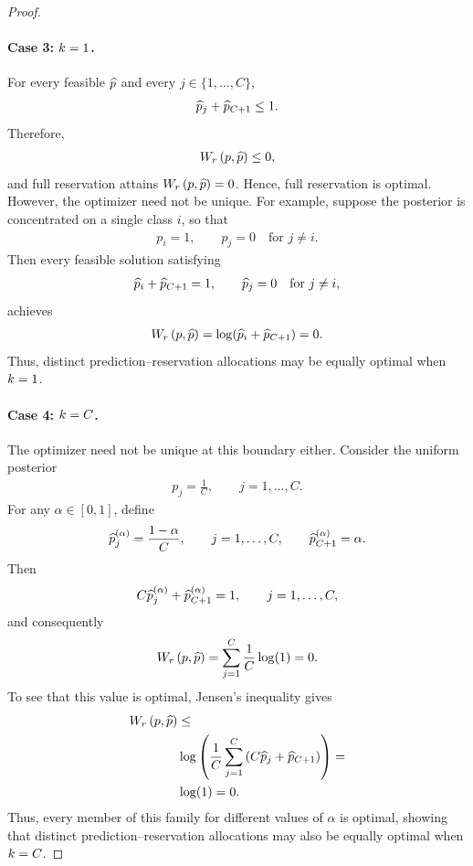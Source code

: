 \begin{proof}
    \paragraph{Case 3: \(k=1\).}
    For every feasible \(\widehat{p}\) and every \(j\in\{1,\ldots,C\}\),
    \begin{align*}
        \widehat{p}_j+\widehat{p}_{C+1}\le1.
    \end{align*}
    Therefore,
    \begin{align*}
        \W{r}\le0,
    \end{align*}
    and full reservation attains \(\W{r}=0\). Hence, full reservation is optimal. However, the optimizer need not be unique. For example, suppose the posterior is concentrated on a single class \(i\), so that
    \begin{align*}
        p_i=1, \qquad p_j=0 \quad \text{for } j\neq i.
    \end{align*}
    Then every feasible solution satisfying
    \begin{align*}
        \widehat{p}_i+\widehat{p}_{C+1}=1, \qquad \widehat{p}_j=0 \quad \text{for } j\neq i,
    \end{align*}
    achieves
    \begin{align*}
        \W{r}=\log(\phat_i+\phat_{C+1})=0.
    \end{align*}
    Thus, distinct prediction--reservation allocations may be equally optimal when \(k=1\).

    \paragraph{Case 4: \(k=C\).}
    The optimizer need not be unique at this boundary either. Consider the uniform posterior
    \begin{align*}
        p_j=\frac{1}{C}, \qquad j=1,\ldots,C.
    \end{align*}
    For any \(\alpha\in[0,1]\), define
    \begin{align*}
        \widehat{p}_j^{(\alpha)}=\frac{1-\alpha}{C}, \qquad j=1,\ldots,C, \qquad \widehat{p}_{C+1}^{(\alpha)}=\alpha.
    \end{align*}
    Then
    \begin{align*}
        C\widehat{p}_j^{(\alpha)}+\widehat{p}_{C+1}^{(\alpha)}=1, \qquad j=1,\ldots,C,
    \end{align*}
    and consequently
    \begin{align*}
        \W{r}=\sum_{j=1}^{C}\frac{1}{C}\log(1)=0.
    \end{align*}
    To see that this value is optimal, Jensen's inequality gives
    \begin{align*}
        \W{r} & \le                                                                          \\
              & \log\left(\frac{1}{C}\sum_{j=1}^{C}\left(C\phat_j+\phat_{C+1}\right)\right)= \\
              & \log(1)=0.
    \end{align*}
    Thus, every member of this family for different values of \(\alpha\) is optimal, showing that distinct prediction--reservation allocations may also be equally optimal when \(k=C\).


\end{proof}
